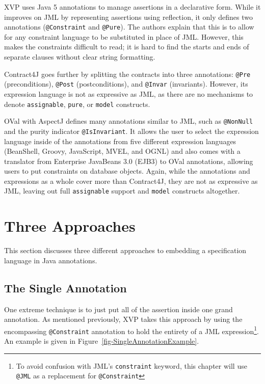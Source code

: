 \documentclass{llncs}
\newcommand{\figref}[1]{Figure~\vref{#1}}
\begin{document}
XVP \cite{Royer-Alagic-Dillon07} uses Java 5 annotations to manage assertions in a declarative form.  While it improves on JML by representing assertions using reflection, it only defines two annotations (\lstinline[language={[JML5]Java}]{@Constraint} and \lstinline[language={[JML5]Java}]{@Pure}).  The authors explain that this is to allow for any constraint language to be substituted in place of JML.  However, this makes the constraints difficult to read; it is hard to find the starts and ends of separate clauses without clear string formatting.

Contract4J \cite{Wampler06} goes further by splitting the contracts into three annotations: \lstinline[language={[JML5]Java}]{@Pre} (preconditions), \lstinline[language={[JML5]Java}]{@Post} (postconditions), and \lstinline[language={[JML5]Java}]{@Invar} (invariants).  However, its expression language is not as expressive as JML, as there are no mechanisms to denote \lstinline[language={[JML5]Java}]{assignable}, \lstinline[language={[JML5]Java}]{pure}, or \lstinline[language={[JML5]Java}]{model} constructs.

OVal with AspectJ \cite{Thomschke07} defines many annotations similar to JML, such as \lstinline[language={[JML5]Java}]{@NonNull} and the purity indicator \lstinline[language={[JML5]Java}]{@IsInvariant}.  It allows the user to select the expression language inside of the annotations from five different expression languages (BeanShell, Groovy, JavaScript, MVEL, and OGNL) and also comes with a translator from Enterprise JavaBeans 3.0 (EJB3) to OVal annotations, allowing users to put constraints on database objects.  Again, while the annotations and expressions as a whole cover more than Contract4J, they are not as expressive as JML, leaving out full \lstinline[language={[JML5]Java}]{assignable} support and \lstinline[language={[JML5]Java}]{model} constructs altogether.

\section{Three Approaches}

This section discusses three different approaches to embedding a specification language in Java annotations.

\subsection{The Single Annotation}

One extreme technique is to just put all of the assertion inside one grand annotation.  As mentioned previously, XVP takes this approach by using the encompassing \lstinline[language={[JML5]Java}]{@Constraint} annotation to hold the entirety of a JML expression\footnote{To avoid confusion with JML's \lstinline[language={[JML5]Java}]{constraint} keyword, this chapter will use \lstinline[language={[JML5]Java}]{@JML} as a replacement for \lstinline[language={[JML5]Java}]{@Constraint}}.  An example is given in \figref{fig-SingleAnnotationExample}.
\end{document}
